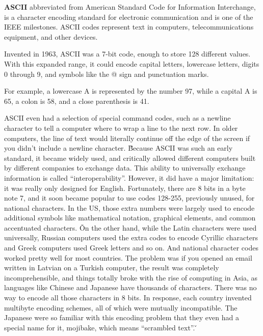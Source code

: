 \bd[ASCII]
\textbf{ASCII} abbreviated from American Standard Code for Information Interchange, is a character encoding standard
for electronic communication and is one of the IEEE milestones. ASCII codes represent text in computers,
telecommunications equipment, and other devices.
\ed

Invented in 1963, ASCII was a 7-bit code, enough to store 128 different values. With this expanded range, it could
encode capital letters, lowercase letters, digits 0 through 9, and symbols like the @ sign and punctuation marks.

\be
For example, a lowercase A is represented by the number 97, while a capital A is 65, a colon is 58, and a close
parenthesis is 41.
\ee

ASCII even had a selection of special command codes, such as a newline character to tell a computer where to wrap a
line to the next row. In older computers, the line of text would literally continue off the edge of the screen if you
didn't include a newline character. \v

Because ASCII was such an early standard, it became widely used, and critically allowed different computers built by
different companies to exchange data. This ability to universally exchange information is called ``interoperability''.
However, it did have a major limitation: it was really only designed for English. Fortunately, there are 8 bits in
a byte note 7, and it soon became popular to use codes 128-255, previously unused, for national characters. In the
US, those extra numbers were largely used to encode additional symbols like mathematical notation, graphical
elements, and common accentuated characters. \v

On the other hand, while the Latin characters were used universally, Russian computers used the extra codes to encode
Cyrillic characters and Greek computers used Greek letters and so on. And national character codes worked pretty well
for most countries. The problem was if you opened an email written in Latvian on a Turkish computer, the result was
completely incomprehensible, and things totally broke with the rise of computing in Asia, as languages like Chinese
and Japanese have thousands of characters. There was no way to encode all those characters in 8 bits. In response,
each country invented multibyte encoding schemes, all of which were mutually incompatible. The Japanese were so
familiar with this encoding problem that they even had a special name for it, mojibake, which means ``scrambled
text''. \v

